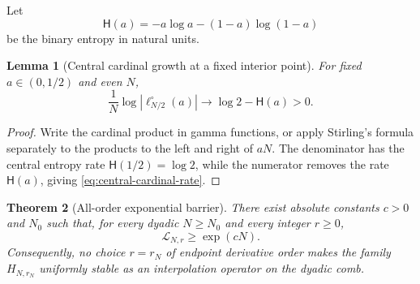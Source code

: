 \documentclass[11pt,oneside]{article}
\newtheorem{theorem}{Theorem}[section]
\newtheorem{lemma}[theorem]{Lemma}
\theoremstyle{definition}
\theoremstyle{remark}
\newcommand{\abs}[1]{\left\lvert #1\right\rvert}
\begin{document}
Let
\begin{equation}
 \mathsf H(a)=-a\log a-(1-a)\log(1-a)
 \label{eq:entropy}
\end{equation}
be the binary entropy in natural units.

\begin{lemma}[Central cardinal growth at a fixed interior point]
\label{lem:central-cardinal}
For fixed $a\in(0,1/2)$ and even $N$,
\begin{equation}
 \frac1N\log\abs{\ell_{N/2}^{\circ}(a)}
 \longrightarrow \log2-\mathsf H(a)>0.
 \label{eq:central-cardinal-rate}
\end{equation}
\end{lemma}

\begin{proof}
Write the cardinal product in gamma functions, or apply Stirling's formula separately to the products to the left and right of $aN$.  The denominator has the central entropy rate $\mathsf H(1/2)=\log2$, while the numerator removes the rate $\mathsf H(a)$, giving \eqref{eq:central-cardinal-rate}.
\end{proof}

\begin{theorem}[All-order exponential barrier]
\label{thm:all-r-barrier}
There exist absolute constants $c>0$ and $N_0$ such that, for every dyadic $N\ge N_0$ and every integer $r\ge0$,
\begin{equation}
 \mathscr L_{N,r}\ge \exp(cN).
 \label{eq:all-r-barrier}
\end{equation}
Consequently, no choice $r=r_N$ of endpoint derivative order makes the family $H_{N,r_N}$ uniformly stable as an interpolation operator on the dyadic comb.
\end{theorem}
\end{document}
